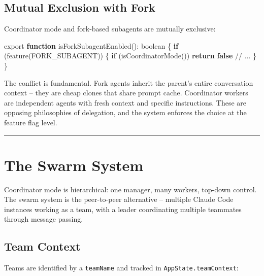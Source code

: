 \documentclass[
  english,
  11pt,
  letterpaper,
]{book}
\newenvironment{Shaded}{\begin{snugshade}}{\end{snugshade}}
\newcommand{\CommentTok}[1]{\textcolor[rgb]{0.37,0.37,0.37}{#1}}
\newcommand{\ControlFlowTok}[1]{\textcolor[rgb]{0.00,0.23,0.31}{\textbf{#1}}}
\newcommand{\DataTypeTok}[1]{\textcolor[rgb]{0.68,0.00,0.00}{#1}}
\newcommand{\FunctionTok}[1]{\textcolor[rgb]{0.28,0.35,0.67}{#1}}
\newcommand{\ImportTok}[1]{\textcolor[rgb]{0.00,0.46,0.62}{#1}}
\newcommand{\KeywordTok}[1]{\textcolor[rgb]{0.00,0.23,0.31}{\textbf{#1}}}
\newcommand{\NormalTok}[1]{\textcolor[rgb]{0.00,0.23,0.31}{#1}}
\newcommand{\OperatorTok}[1]{\textcolor[rgb]{0.37,0.37,0.37}{#1}}
\newcommand{\StringTok}[1]{\textcolor[rgb]{0.13,0.47,0.30}{#1}}
\begin{document}
\subsection{Mutual Exclusion with
Fork}\label{mutual-exclusion-with-fork}

Coordinator mode and fork-based subagents are mutually exclusive:

\begin{Shaded}
\begin{Highlighting}[]
\ImportTok{export} \KeywordTok{function} \FunctionTok{isForkSubagentEnabled}\NormalTok{()}\OperatorTok{:} \DataTypeTok{boolean}\NormalTok{ \{}
  \ControlFlowTok{if}\NormalTok{ (}\FunctionTok{feature}\NormalTok{(}\StringTok{\textquotesingle{}FORK\_SUBAGENT\textquotesingle{}}\NormalTok{)) \{}
    \ControlFlowTok{if}\NormalTok{ (}\FunctionTok{isCoordinatorMode}\NormalTok{()) }\ControlFlowTok{return} \KeywordTok{false}
    \CommentTok{// ...}
\NormalTok{  \}}
\NormalTok{\}}
\end{Highlighting}
\end{Shaded}

The conflict is fundamental. Fork agents inherit the parent's entire
conversation context -- they are cheap clones that share prompt cache.
Coordinator workers are independent agents with fresh context and
specific instructions. These are opposing philosophies of delegation,
and the system enforces the choice at the feature flag level.

\begin{center}\rule{0.5\linewidth}{0.5pt}\end{center}

\section{The Swarm System}\label{the-swarm-system}

Coordinator mode is hierarchical: one manager, many workers, top-down
control. The swarm system is the peer-to-peer alternative -- multiple
Claude Code instances working as a team, with a leader coordinating
multiple teammates through message passing.

\subsection{Team Context}\label{team-context}

Teams are identified by a \texttt{teamName} and tracked in
\texttt{AppState.teamContext}:
\end{document}
